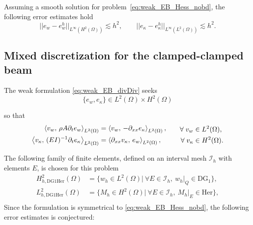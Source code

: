 \begin{conjecture}\label{conj:HerDG1estimates}
	Assuming a smooth solution for problem~\eqref{eq:weak_EB_Hess_nobd}, the following error estimates hold
	\begin{equation}
	\label{eq:errHerDG1}
	||e_w - e_w^h||_{L^{\infty} (H^2(\Omega))} \lesssim h^{2}, \qquad
	||e_\kappa - e_\kappa^h||_{L^{\infty} (L^2(\Omega))} \lesssim h^{2}.
	\end{equation}
\end{conjecture}


\subsection{Mixed discretization for the clamped-clamped beam}
The weak formulation \eqref{eq:weak_EB_divDiv} seeks 
\begin{equation*}
\{e_w, e_\kappa\} \in L^2(\Omega) \times H^2(\Omega) 
\end{equation*}

so that
\begin{equation}\label{eq:weak_EB_divDiv_nobd}
\begin{aligned}
\inner[L^2(\Omega)]{v_w}{\rho A \partial_t e_w} &= \inner[L^2(\Omega)]{v_w}{-\partial_{xx} e_\kappa} , \\
\inner[L^2(\Omega)]{v_\kappa}{(EI)^{-1} \partial_t e_\kappa} &= \inner[L^2(\Omega)]{\partial_{xx} v_\kappa}{ e_w}, \\
\end{aligned}\qquad
\begin{aligned}
\forall \; v_w &\in L^2(\Omega), \\
\forall \; v_\kappa &\in H^2(\Omega).
\end{aligned}
\end{equation}

 The following family of finite elements, defined on an interval mesh $\mathcal{I}_h$ with elements $E$, is chosen for this problem
\begin{equation}
\label{eq:DG1Her}
\begin{aligned}
H_{h, \text{DG1Her}}^{2}(\Omega) &= \{ w_h \in L^{2}(\Omega) | \ \forall E \in \mathcal{I}_h,\ w_h|_{Q} \in \mathrm{DG}_{1} \}, \\ 
L_{h, \text{DG1Her}}^2(\Omega) &= \{M_h \in H^2(\Omega) | \ \forall E \in \mathcal{I}_h, \ M_h|_{E} \in \mathrm{Her} \}, \\
\end{aligned}
\end{equation}
Since the formulation is symmetrical to \eqref{eq:weak_EB_Hess_nobd}, the following error estimates is conjectured:

